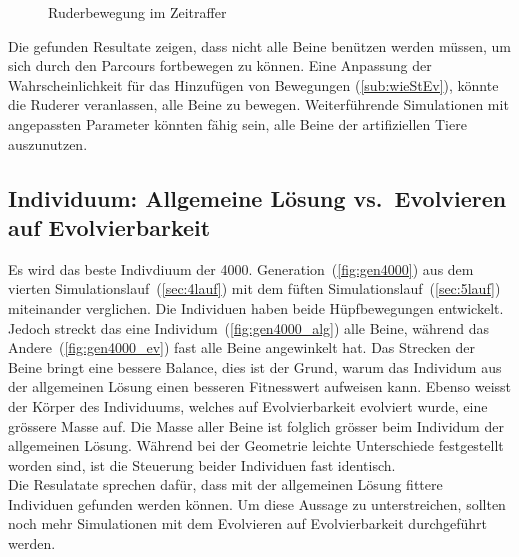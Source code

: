 \begin{figure}[H]
        \caption{Ruderbewegung im Zeitraffer\label{fig:ruder}}

      \end{figure}

      Die gefunden Resultate zeigen,
      dass nicht alle Beine benützen werden müssen, um sich durch den Parcours fortbewegen zu können.
      Eine Anpassung der Wahrscheinlichkeit für das Hinzufügen von Bewegungen (\vref{sub:wieStEv}),
      könnte die Ruderer veranlassen, alle Beine zu bewegen.
      Weiterführende Simulationen mit angepassten Parameter könnten fähig sein,
      alle Beine der artifiziellen Tiere auszunutzen.

    \subsection{Individuum: Allgemeine Lösung vs.\ Evolvieren auf Evolvierbarkeit}

      Es wird das beste Indivdiuum der 4000. Generation~(\vref{fig:gen4000}) aus dem vierten Simulationslauf~(\vref{sec:4lauf})
      mit dem füften Simulationslauf~(\vref{sec:5lauf}) miteinander verglichen.
      Die Individuen haben beide Hüpfbewegungen entwickelt.
      Jedoch streckt das eine Individum~(\vref{fig:gen4000_alg}) alle Beine,
      während das Andere~(\vref{fig:gen4000_ev}) fast alle Beine angewinkelt hat.
      Das Strecken der Beine bringt eine bessere Balance,
      dies ist der Grund, warum das Individum aus der allgemeinen Lösung einen besseren Fitnesswert aufweisen kann.
      Ebenso weisst der Körper des Individuums, welches auf Evolvierbarkeit evolviert wurde, eine grössere Masse auf.
      Die Masse aller Beine ist folglich grösser beim Individum der allgemeinen Lösung.
      Während bei der Geometrie leichte Unterschiede festgestellt worden sind,
      ist die Steuerung beider Individuen fast identisch.
      \\
      Die Resulatate sprechen dafür, dass mit der allgemeinen Lösung fittere Individuen gefunden werden können.
      Um diese Aussage zu unterstreichen,
      sollten noch mehr Simulationen mit dem Evolvieren auf Evolvierbarkeit durchgeführt werden.

